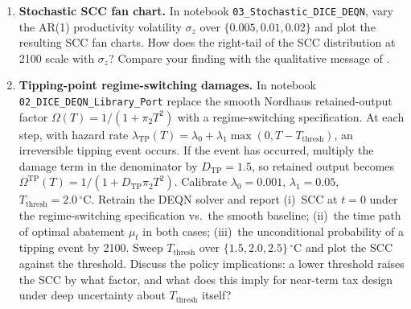 \documentclass[11pt,a4paper]{report}
\begin{document}
\begin{enumerate}[itemsep=4pt, leftmargin=*]
\item\label{ex:ch11:7} \textbf{Stochastic SCC fan chart.}  In notebook \texttt{03\_Stochastic\_DICE\_DEQN}, vary the AR(1) productivity volatility $\sigma_z$ over $\{0.005, 0.01, 0.02\}$ and plot the resulting SCC fan charts.  How does the right-tail of the SCC distribution at 2100 scale with $\sigma_z$?  Compare your finding with the qualitative message of \citet{caiSocialCostCarbon2019}.
\item\label{ex:ch11:8} \textbf{Tipping-point regime-switching damages.}  In notebook \texttt{02\_DICE\_DEQN\_Library\_Port} replace the smooth Nordhaus retained-output factor $\Omega(T) = 1/(1 + \pi_2 T^2)$ with a regime-switching specification.  At each step, with hazard rate $\lambda_\mathrm{TP}(T) = \lambda_0 + \lambda_1\max(0, T - T_\mathrm{thresh})$, an irreversible tipping event occurs.  If the event has occurred, multiply the damage term in the denominator by $D_\mathrm{TP}=1.5$, so retained output becomes $\Omega^{\mathrm{TP}}(T)=1/(1+D_\mathrm{TP}\pi_2T^2)$.  Calibrate $\lambda_0 = 0.001$, $\lambda_1 = 0.05$, $T_\mathrm{thresh} = 2.0\,^\circ\mathrm{C}$.  Retrain the DEQN solver and report (i)~SCC at $t = 0$ under the regime-switching specification vs.\ the smooth baseline; (ii)~the time path of optimal abatement $\mu_t$ in both cases; (iii)~the unconditional probability of a tipping event by 2100.  Sweep $T_\mathrm{thresh}$ over $\{1.5, 2.0, 2.5\}\,^\circ\mathrm{C}$ and plot the SCC against the threshold.  Discuss the policy implications: a lower threshold raises the SCC by what factor, and what does this imply for near-term tax design under deep uncertainty about $T_\mathrm{thresh}$ itself?

\end{enumerate}
\end{document}
